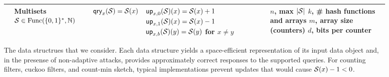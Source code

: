 \begin{figure*}[tp]
\begin{center}
\begin{tabular}{ |p{1.75cm} | p{2.5cm} | p{2.95cm} | p{4cm} | p{3.7cm}|}
          & \parbox[c]{2.5cm}{Multisets\\ $\mathcal{S} \in \mathrm{Func}(\{0,1\}^*,\mathbb{N})$}
          & $\mathsf{qry}_x(\mathcal{S}) = \mathcal{S}(x)$
          & \parbox[c][10ex]{4cm}{$\mathsf{up}_{x,0}(\mathcal{S})(x) = \mathcal{S}(x)+1$ \\ $\mathsf{up}_{x,1}(\mathcal{S})(x) = \mathcal{S}(x)-1$ \\ $\mathsf{up}_{x,b}(\mathcal{S})(y) = \mathcal{S}(y)$ for $x \neq y$}
          & \parbox[c]{3.75cm}{$n$, max $|\mathcal{S}|$\\$k$, \# hash functions and arrays\\$m$, array size (counters)\\$d$, bits per counter}
          \\ \hline
  \end{tabular}
\caption{The data structrues that we consider. Each data structure yields a
space-efficient representation of its input data object and, in the presense of
non-adaptive attacks, provides approximately correct responses to the supported
queries.  For counting filters, cuckoo filters, and count-min sketch, typical
implementations prevent updates that would cause $\mathcal{S}(x)-1 < 0$.}
  \label{fig:structures-summary}
  \label{fig:tab-structures}
\end{center}
\end{figure*}